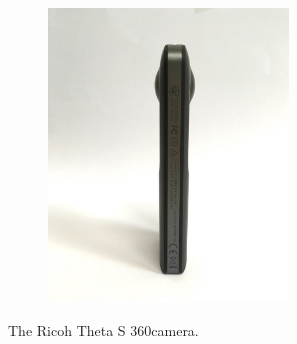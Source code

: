 \begin{figure}
\begin{subfigure}{0.3\textwidth}
	\end{subfigure}
	\begin{subfigure}{0.3\textwidth}
		\centering
		\includegraphics[width=0.7\textwidth]{img/theta3}
	\end{subfigure}
	\caption{\label{fig:ricoh_theta}The Ricoh Theta S 360\degree camera.}
\end{figure}

